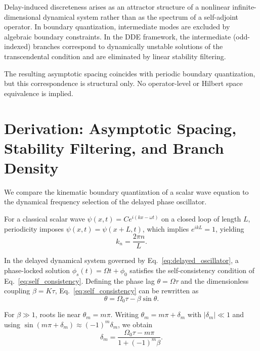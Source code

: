 \documentclass[11pt]{article}
\begin{document}
        Delay-induced discreteness arises as an attractor structure of a nonlinear infinite-dimensional dynamical system rather than as the spectrum of a self-adjoint operator.
        In boundary quantization, intermediate modes are excluded by algebraic boundary constraints.
        In the DDE framework, the intermediate (odd-indexed) branches correspond to dynamically unstable solutions of the transcendental condition and are eliminated by linear stability filtering.

        The resulting asymptotic spacing coincides with periodic boundary quantization, but this correspondence is structural only.
        No operator-level or Hilbert space equivalence is implied.

    \section{Derivation: Asymptotic Spacing, Stability Filtering, and Branch Density}

        We compare the kinematic boundary quantization of a scalar wave equation to the dynamical frequency selection of the delayed phase oscillator.

        For a classical scalar wave $\psi(x,t) = C e^{i(kx-\omega t)}$ on a closed loop of length $L$, periodicity imposes $\psi(x,t)=\psi(x+L,t)$, which implies $e^{ikL}=1$, yielding
        \begin{equation}
            k_n=\frac{2\pi n}{L}.
            \label{eq:k_n}
        \end{equation}

        In the delayed dynamical system governed by Eq.~\ref{eq:delayed_oscillator}, a phase-locked solution $\phi_s(t)=\Omega t+\phi_0$ satisfies the self-consistency condition of Eq.~\ref{eq:self_consistency}. Defining the phase lag $\theta=\Omega\tau$ and the dimensionless coupling $\beta=K\tau$, Eq.~\ref{eq:self_consistency} can be rewritten as
        \begin{equation}
            \theta=\Omega_0\tau-\beta\sin\theta.
            \label{eq:theta_beta}
        \end{equation}

        For $\beta\gg1$, roots lie near $\theta_m=m\pi$. Writing $\theta_m=m\pi+\delta_m$ with $|\delta_m|\ll1$ and using $\sin(m\pi+\delta_m)\approx(-1)^m\delta_m$, we obtain
        \begin{equation}
            \delta_m=\frac{\Omega_0\tau-m\pi}{1+(-1)^m\beta}.
            \label{eq:delta_m}
        \end{equation}
\end{document}
